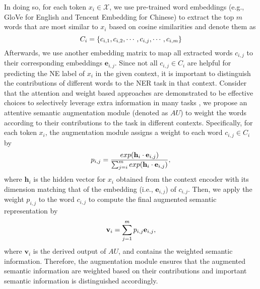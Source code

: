 \documentclass[11pt,a4paper]{article}
\begin{document}
In doing so, 
for each token $x_i \in \mathcal{X}$,
we use pre-trained word embeddings (e.g., GloVe for English and Tencent Embedding for Chinese) to extract the top $m$ words that are most similar to $x_i$ based on cosine similarities and denote them as
\begin{equation}
    \setlength\abovedisplayskip{5pt}
    \setlength\belowdisplayskip{5pt}
    {C}_i = \{c_{i,1}, c_{i,2}, \cdots, c_{i,j}, \cdots, c_{i,m}\}
\end{equation}
Afterwards, we use another embedding matrix to map all extracted words $c_{i,j}$ to their corresponding embeddings $\mathbf{e}_{i,j}$.
Since not all $c_{i,j} \in C_i$ are helpful for predicting the NE label of $x_i$ in the given context, it is important to distinguish the contributions of different words to the NER task in that context.
Consider that the attention and weight based approaches are demonstrated to be effective choices to selectively leverage extra information in many tasks \cite{kumar-etal-2018-knowledge,margatina-etal-2019-attention,tian-etal-2020-joint,tian2020improving,tian-etal-2020-suppertagging,tian-etal-2020-constituency}, we propose an attentive semantic augmentation module (denoted as $AU$) to weight the words according to their contributions to the task in different contexts.
Specifically, for each token $x_i$, the augmentation module assigns a weight to each word $c_{i,j} \in C_i$ by
\begin{equation}
    \setlength\abovedisplayskip{5pt}
    \setlength\belowdisplayskip{5pt}
    p_{i,j} = \frac{exp(\mathbf{h}_i \cdot \mathbf{e}_{i,j})}{\sum_{j=i}^m exp(\mathbf{h}_i \cdot \mathbf{e}_{i,j})},
\end{equation}
where $\mathbf{h}_i$ is the hidden vector for $x_i$ obtained from the context encoder with its dimension matching that of the embedding (i.e., $\mathbf{e}_{i,j}$) of $c_{i,j}$. 
Then, we apply the weight $p_{i,j}$ to the word $c_{i,j}$ to compute the final augmented semantic representation by
\begin{equation}
    \setlength\abovedisplayskip{5pt}
    \setlength\belowdisplayskip{5pt}
    \mathbf{v}_i = \sum_{j=1}^{m} p_{i,j} \mathbf{e}_{i,j},
\end{equation}
where $\mathbf{v}_i$ is the derived output of ${AU}$, and contains the weighted semantic information.
Therefore, the augmentation module ensures that the augmented semantic information are weighted based on their contributions and important semantic information is distinguished accordingly.
\end{document}
